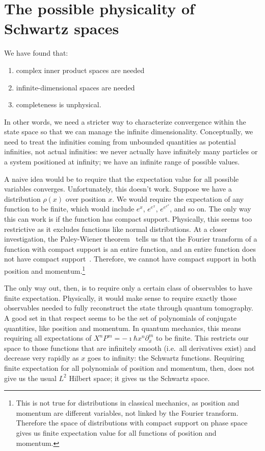 \documentclass[10pt,twocolumn, nofootinbib]{revtex4-2}
\begin{document}
\section{The possible physicality of Schwartz spaces}

We have found that:
\begin{enumerate}
\item complex inner product spaces are needed
\item infinite-dimensional spaces are needed
\item completeness is unphysical.
\end{enumerate}
In other words, we need a stricter way to characterize convergence within the state space so that we can manage the infinite dimensionality. Conceptually, we need to treat the infinities coming from unbounded quantities as potential infinities, not actual infinities: we never actually have infinitely many particles or a system positioned at infinity; we have an infinite range of possible values.

A naive idea would be to require that the expectation value for all possible variables converges. Unfortunately, this doesn't work. Suppose we have a distribution $\rho(x)$ over position $x$. We would require the expectation of any function to be finite, which would include $e^x$, $e^{e^x}$, $e^{e^{e^x}}$, and so on. The only way this can work is if the function has compact support. Physically, this seems too restrictive as it excludes functions like normal distributions. At a closer investigation, the Paley-Wiener theorem~\cite{fourierCompact} tells us that the Fourier transform of a function with compact support is an entire function, and an entire function does not have compact support~\cite{markushevich2014entire}. Therefore, we cannot have compact support in both position and momentum.\footnote{This is not true for distributions in classical mechanics, as position and momentum are different variables, not linked by the Fourier transform. Therefore the space of distributions with compact support on phase space gives us finite expectation value for all functions of position and momentum.}

The only way out, then, is to require only a certain class of observables to have finite expectation. Physically, it would make sense to require exactly those observables needed to fully reconstruct the state through quantum tomography. A good set in that respect seems to be the set of polynomials of conjugate quantities, like position and momentum. In quantum mechanics, this means requiring all expectations of $X^nP^m = -\imath \hbar x^n\partial_x ^m$ to be finite. This restricts our space to those functions that are infinitely smooth (i.e.~all derivatives exist) and decrease very rapidly as $x$ goes to infinity: the Schwartz functions. Requiring finite expectation for all polynomials of position and momentum, then, does not give us the usual $L^2$ Hilbert space; it gives us the Schwartz space.
\end{document}
